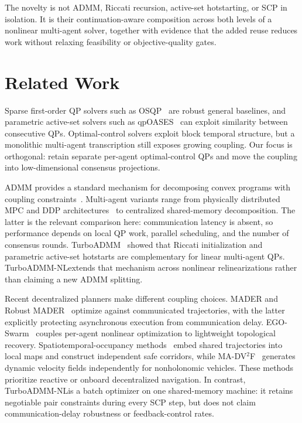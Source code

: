 \documentclass[letterpaper,10pt,conference]{ieeeconf}
\newcommand{\method}{TurboADMM-NL}
\newcommand{\oldmethod}{TurboADMM}
\begin{document}
The novelty is not ADMM, Riccati recursion, active-set hotstarting, or SCP in
isolation. It is their continuation-aware composition across both levels of a
nonlinear multi-agent solver, together with evidence that the added reuse
reduces work without relaxing feasibility or objective-quality gates.

\section{Related Work}
\label{sec:related}
Sparse first-order QP solvers such as OSQP~\cite{Stellato2020OSQP} are robust
general baselines, and parametric active-set solvers such as
qpOASES~\cite{Ferreau2014qpOASES} can exploit similarity between consecutive
QPs. Optimal-control solvers exploit block temporal structure, but a
monolithic multi-agent transcription still exposes growing coupling. Our
focus is orthogonal: retain separate per-agent optimal-control QPs and move the
coupling into low-dimensional consensus projections.

ADMM provides a standard mechanism for decomposing convex programs with
coupling constraints~\cite{Boyd2011ADMM}. Multi-agent variants range from
physically distributed MPC and DDP architectures~\cite{Luis2020DMPC,Saravanos2023DDP}
to centralized shared-memory decomposition. The latter is the relevant
comparison here: communication latency is absent, so performance depends on
local QP work, parallel scheduling, and the number of consensus rounds.
\oldmethod~\cite{Chen2026TurboADMM} showed that Riccati initialization and
parametric active-set hotstarts are complementary for linear multi-agent QPs.
\method extends that mechanism across nonlinear relinearizations rather than
claiming a new ADMM splitting.

Recent decentralized planners make different coupling choices. MADER and
Robust MADER~\cite{Tordesillas2022MADER,Kondo2023RobustMADER} optimize against
communicated trajectories, with the latter explicitly protecting asynchronous
execution from communication delay. EGO-Swarm~\cite{Zhou2021EGOSwarm} couples
per-agent nonlinear optimization to lightweight topological recovery.
Spatiotemporal-occupancy methods~\cite{Wu2024SOGM} embed shared trajectories
into local maps and construct independent safe corridors, while
MA-DV$^2$F~\cite{Ma2025MADV2F} generates dynamic velocity fields independently
for nonholonomic vehicles. These methods prioritize reactive or onboard
decentralized navigation. In contrast, \method is a batch optimizer on one
shared-memory machine: it retains negotiable pair constraints during every SCP
step, but does not claim communication-delay robustness or feedback-control
rates.
\end{document}
